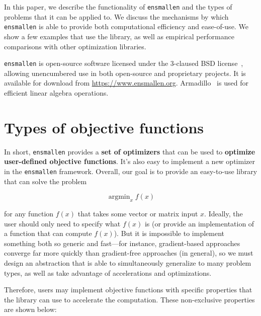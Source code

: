 \documentclass{article}
\begin{document}
In this paper, we describe the functionality of {\tt ensmallen} and the types of
problems that it can be applied to.  We discuss the mechanisms by which {\tt ensmallen} is
able to provide both computational efficiency and ease-of-use.
We show a few examples that use the library, as well as empirical performance comparisons
with other optimization libraries.

{\tt ensmallen} is open-source software licensed under the 3-claused BSD license~\cite{TODO},
allowing unencumbered use in both open-source and proprietary projects.
It is available for download from \url{https://www.ensmallen.org}.
Armadillo~\cite{TODO} is used for efficient linear algebra operations.



\section{Types of objective functions}

In short, {\tt ensmallen} provides a {\bf set of optimizers} that can be used to
{\bf optimize user-defined objective functions}.  It's also easy to implement a
new optimizer in the {\tt ensmallen} framework.  Overall, our goal is to provide
an easy-to-use library that can solve the problem

\begin{equation}
\operatorname{argmin}_{x} f(x)
\end{equation}

\noindent for any function $f(x)$ that takes some vector or matrix input $x$.  Ideally,
the user should only need to specify what $f(x)$ is (or provide an
implementation of a function that can compute $f(x)$).  But it is impossible to
implement something both so generic and fast---for instance, gradient-based
approaches converge far more quickly than gradient-free approaches (in general),
so we must design an abstraction that is able to simultaneously generalize to
many problem types, as well as take advantage of accelerations and
optimizations.

Therefore, users may implement objective functions with specific properties that
the library can use to accelerate the computation.  These non-exclusive
properties are shown below:
\end{document}
